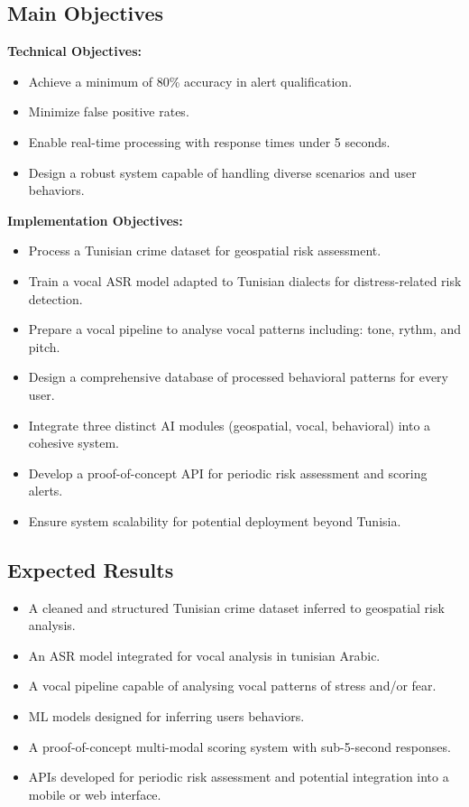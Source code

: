 \documentclass[12pt,a4paper,oneside,english]{book}
\begin{document}
\subsection{Main Objectives}

\textbf{Technical Objectives:}
\begin{itemize}
    \item Achieve a minimum of 80\% accuracy in alert qualification.
    \item Minimize false positive rates. 
    \item Enable real-time processing  with response times under 5 seconds.
    \item Design a robust system capable of handling diverse scenarios and user behaviors.
\end{itemize}

\textbf{Implementation Objectives:}
\begin{itemize}

\item Process a Tunisian crime dataset for geospatial risk assessment.
\item Train a vocal ASR model adapted to Tunisian dialects for distress-related risk detection.
\item Prepare a vocal pipeline to analyse vocal patterns including: tone, rythm, and pitch.
\item Design a comprehensive database of processed behavioral patterns for every user.
   \item Integrate three distinct AI modules (geospatial, vocal, behavioral) into a cohesive system.
    \item Develop a proof-of-concept API for periodic risk assessment and scoring alerts.
    \item Ensure system scalability for potential deployment beyond Tunisia.
\end{itemize}

\subsection{Expected Results}
\begin{itemize}
\item A cleaned and structured Tunisian crime dataset inferred to geospatial risk analysis.
\item An ASR model integrated for vocal analysis in tunisian Arabic. %
\item A vocal pipeline capable of analysing vocal patterns of stress and/or fear.
\item ML models designed for inferring  users behaviors.
\item A proof-of-concept multi-modal scoring system with sub-5-second responses.
\item APIs developed for periodic risk assessment and potential integration into a mobile or web interface.
\end{itemize}
\end{document}
